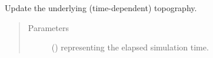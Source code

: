 \documentclass[letterpaper,10pt,english]{sphinxmanual}
\begin{document}
\begin{fulllineitems}

\begin{fulllineitems}
\label{\detokenize{api:tasmania.dycore.dycore.DynamicalCore.update_topography}}
Update the underlying (time-dependent) topography.
\begin{quote}\begin{description}
\item[{Parameters}] \leavevmode
{} () \textendash{}  representing the elapsed simulation time.

\end{description}\end{quote}

\end{fulllineitems}


\end{fulllineitems}

\end{document}
